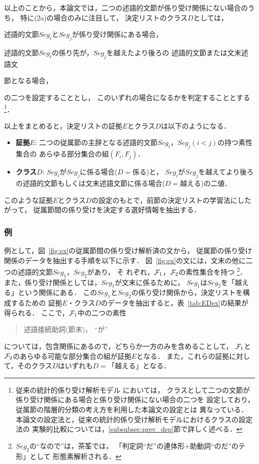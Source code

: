 以上のことから，本論文では，二つの述語的文節が係り受け関係にない場合のうち，
特に(2a)の場合のみに注目して，
決定リストのクラス$D$としては，
\medskip
\begin{enumerate}
  \noindent\begin{minipage}{\textwidth}\item 述語的文節$Seg_i$と$Seg_j$が係り受け関係にある場合，
  \item 述語的文節$Seg_i$の係り先が，$Seg_j$を越えたより後ろの
        述語的文節または文末述語文
\end{minipage}節となる場合，
\end{enumerate}
の二つを設定することとし，
このいずれの場合になるかを判定することとする
\footnote{
   従来の統計的係り受け解析モデル
   \cite{Collins96a,Fujio97aj,Ehara98aj,Haruno98cj,Uchimoto98aj}\mbox{においては，}
   クラスとして二つの文節が係り受け関係にある場合と係り受け関係にない場合の二つを
   設定しており，従属節の階層的分類の考え方を利用した本論文の設定とは
   異なっている．
   本論文の設定法と，従来の統計的係り受け解析モデルにおけるクラスの設定法の
   実験的比較については，\ref{subsubsec:prev_dep}節で詳しく述べる．
}．

以上をまとめると，決定リストの証拠$E$とクラス$D$は以下のようになる．
\begin{itemize}
  \item {\bf 証拠}$E$: 二つの従属節の主辞となる述語的文節$Seg_i$，$Seg_j (i\!<\!j)$の持つ素性集合の
        あらゆる部分集合の組$(F_{i},F_{j})$．
  \item {\bf クラス}$D$: $Seg_i$が$Seg_j$に係る場合($D\!=\!係る$)と，
        $Seg_i$が$Seg_j$を越えてより\mbox{後ろの述語}的文節もしくは文末述語文節に係る場合($D\!=\!越える$)の二値．
\end{itemize}
このような証拠$E$とクラス$D$の設定のもとで，前節の決定リストの学習法にしたがって，
従属節間の係り受けを決定する選好情報を抽出する．


\subsubsection*{例}

例として，図~\ref{fig:ex}の従属節間の係り受け解析済の文から，
従属節の係り受け関係のデータを抽出する手順を以下に示す．
図~\ref{fig:ex}の文には，文末の他に二つの述語的文節$Seg_1$，$Seg_2$があり，
そ\break
れぞれ，${\cal F}_1$，${\cal F}_2$の素性集合を持つ
\footnote{
  $Seg_2$の``なので''は，茶筌では，
  「判定詞``だ''の連体形+助動詞``のだ''のテ形」として
   形態素解析される．
}．
また，係り受け関係としては，$Seg_1$が文末に係るために，
$Seg_1$は$Seg_2$を「越える」という関係にある．
この$Seg_1$と$Seg_2$の係り受け\mbox{関係から，決定リス}トを構成するための
証拠$E$・クラス$D$のデータを抽出すると，表~\ref{tab:EDex}の結果が得られる．
ここで，${\cal F}_1$中の二つの素性
\begin{quote}
述語接続助詞(節末)， ``が''
\end{quote}
については，包含関係にあるので，どちらか一方のみを含めることして，
${\cal F}_1$と${\cal F}_2$のあらゆる可能な部分集合の組が証拠$E$となる．
また，これらの証拠に対して，そのクラス$D$はいずれも$D\!=\!「越える」$となる．

